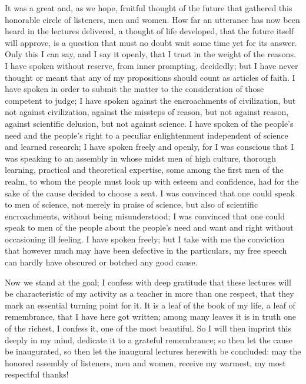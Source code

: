 \documentclass[12pt]{book}
\newcommand{\opage}[1]{\marginnote{\footnotesize\textit{[#1]}}}
\begin{document}
It was a great and, as we hope, fruitful thought of the future that
gathered this honorable circle of listeners, men and women. How far an
utterance has now been heard in the lectures delivered, a thought of life
developed, that the future itself will approve, is a question that must
no doubt wait some time yet for its answer. Only this I can say, and I
say it openly, that I trust in the weight of the reasons. I have spoken
without reserve, from inner prompting, decidedly; but I have never
thought or meant that any of my propositions should count as articles of
faith. I have spoken in order to submit the matter to the consideration
of those competent to judge; I have spoken against the encroachments of
civilization, but not against civilization, against the missteps of
reason, but not against reason, against scientific delusion, but not
against
\opage{295}\setcounter{footnote}{0}%
science. I have spoken of the people's need and the people's right to a
peculiar enlightenment independent of science and learned research; I have
spoken freely and openly, for I was conscious that I was speaking to an
assembly in whose midst men of high culture, thorough learning, practical
and theoretical expertise, some among the first men of the realm, to
whom the people must look up with esteem and confidence, had for the
sake of the cause decided to choose a seat. I was convinced that one
could speak to men of science, not merely in praise of science, but also
of scientific encroachments, without being misunderstood; I was
convinced that one could speak to men of the people about the people's
need and want and right without occasioning ill feeling. I have spoken
freely; but I take with me the conviction that however much may have
been defective in the particulars, my free speech can hardly have obscured
or botched any good cause.

Now we stand at the goal; I confess with deep gratitude that these
lectures will be characteristic of my activity as a teacher in more than
one respect, that they mark an essential turning point for it. It is a
leaf of the book of my life, a leaf of remembrance, that I have here got
written; among many leaves it is in truth one of the richest, I confess
it, one of the most beautiful. So I will then imprint this deeply in my
mind, dedicate it to a grateful remembrance; so then let the cause be
inaugurated, so then let the inaugural lectures herewith be concluded: may
the honored assembly of listeners, men and women, receive my warmest, my
most respectful thanks!
\end{document}
